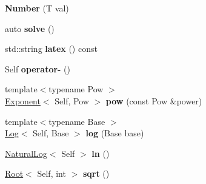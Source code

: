 \begin{DoxyCompactItemize}
\item 
\hypertarget{classlatex_1_1math_1_1Number_ad95c73319da794a949d07258f3cd23f3}{{\bfseries \-Number} (\-T val)}\label{classlatex_1_1math_1_1Number_ad95c73319da794a949d07258f3cd23f3}

\item 
\hypertarget{classlatex_1_1math_1_1Number_a828245764da36255de6fc5de3ff419cf}{auto {\bfseries solve} ()}\label{classlatex_1_1math_1_1Number_a828245764da36255de6fc5de3ff419cf}

\item 
\hypertarget{classlatex_1_1math_1_1Number_a4ba49b934f893e3582f755a2830cc9f5}{std\-::string {\bfseries latex} () const }\label{classlatex_1_1math_1_1Number_a4ba49b934f893e3582f755a2830cc9f5}

\item 
\hypertarget{classlatex_1_1math_1_1Number_a8ab91d58fe8e6708b72d53fb0266b9c9}{\-Self {\bfseries operator-\/} ()}\label{classlatex_1_1math_1_1Number_a8ab91d58fe8e6708b72d53fb0266b9c9}

\item 
\hypertarget{classlatex_1_1math_1_1Number_aa2f067bcad6aa2afd7fb83faea74336a}{{\footnotesize template$<$typename Pow $>$ }\\\hyperlink{classlatex_1_1math_1_1Exponent}{\-Exponent}$<$ \-Self, \-Pow $>$ {\bfseries pow} (const \-Pow \&power)}\label{classlatex_1_1math_1_1Number_aa2f067bcad6aa2afd7fb83faea74336a}

\item 
\hypertarget{classlatex_1_1math_1_1Number_af8ac2784e513ee0761c9a42972fc9744}{{\footnotesize template$<$typename Base $>$ }\\\hyperlink{classlatex_1_1math_1_1Log}{\-Log}$<$ \-Self, \-Base $>$ {\bfseries log} (\-Base base)}\label{classlatex_1_1math_1_1Number_af8ac2784e513ee0761c9a42972fc9744}

\item 
\hypertarget{classlatex_1_1math_1_1Number_a5a808cf6ecbb48144d85cad64def6b42}{\hyperlink{classlatex_1_1math_1_1NaturalLog}{\-Natural\-Log}$<$ \-Self $>$ {\bfseries ln} ()}\label{classlatex_1_1math_1_1Number_a5a808cf6ecbb48144d85cad64def6b42}

\item 
\hypertarget{classlatex_1_1math_1_1Number_a41e6361f370fe20ed6bf147807d8edb3}{\hyperlink{classlatex_1_1math_1_1Root}{\-Root}$<$ \-Self, int $>$ {\bfseries sqrt} ()}\label{classlatex_1_1math_1_1Number_a41e6361f370fe20ed6bf147807d8edb3}

\end{DoxyCompactItemize}
